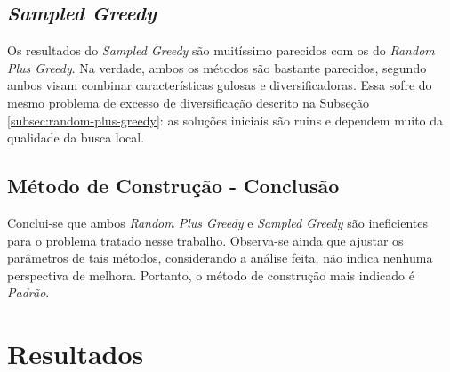 \documentclass{article}
\theoremstyle{definition}
\newcommand{\default}{\textit{Padrão}\xspace}
\newcommand{\randomPlusGreedy}{\textit{Random Plus Greedy}\xspace}
\newcommand{\sampledGreedy}{\textit{Sampled Greedy}\xspace}
\begin{document}
\subsection{\sampledGreedy}

Os resultados do \sampledGreedy são muitíssimo parecidos com os do \randomPlusGreedy. Na verdade, ambos os métodos são bastante parecidos, segundo \cite{bib:grasp} ambos visam combinar características gulosas e diversificadoras. Essa sofre do mesmo problema de excesso de diversificação descrito na Subseção \ref{subsec:random-plus-greedy}: as soluções iniciais são ruins e dependem muito da qualidade da busca local.

\subsection{Método de Construção - Conclusão}

Conclui-se que ambos \randomPlusGreedy e \sampledGreedy são ineficientes para o problema tratado nesse trabalho. Observa-se ainda que ajustar os parâmetros de tais métodos, considerando a análise feita, não indica nenhuma perspectiva de melhora. Portanto, o método de construção mais indicado é \default.

\section{Resultados}







\end{document}
